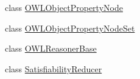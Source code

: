 \begin{DoxyCompactItemize}
\item 
class \hyperlink{classorg_1_1semanticweb_1_1owlapi_1_1reasoner_1_1impl_1_1_o_w_l_object_property_node}{O\-W\-L\-Object\-Property\-Node}
\item 
class \hyperlink{classorg_1_1semanticweb_1_1owlapi_1_1reasoner_1_1impl_1_1_o_w_l_object_property_node_set}{O\-W\-L\-Object\-Property\-Node\-Set}
\item 
class \hyperlink{classorg_1_1semanticweb_1_1owlapi_1_1reasoner_1_1impl_1_1_o_w_l_reasoner_base}{O\-W\-L\-Reasoner\-Base}
\item 
class \hyperlink{classorg_1_1semanticweb_1_1owlapi_1_1reasoner_1_1impl_1_1_satisfiability_reducer}{Satisfiability\-Reducer}
\end{DoxyCompactItemize}
